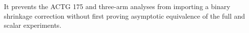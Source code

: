 It prevents the ACTG 175 and three-arm analyses from importing a binary shrinkage correction without first proving asymptotic equivalence of the full and scalar experiments.